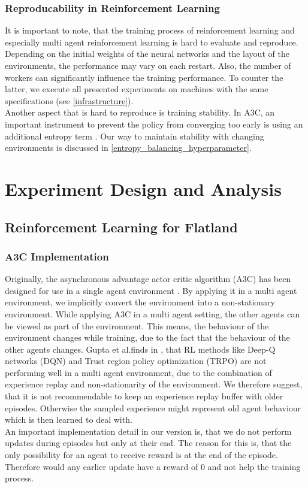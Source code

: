 \subsection*{Reproducability in Reinforcement Learning}\label{reproducability}
It is important to note, that the training process of reinforcement learning and especially multi agent reinforcement learning is hard to evaluate and reproduce. Depending on the initial weights of the neural networks and the layout of the environments, the performance may vary on each restart. Also, the number of workers can 
significantly influence the training performance. To counter the latter, we execute all presented experiments on machines with the same specifications (see \autoref{infrastructure}).\\
Another aspect that is hard to reproduce is training stability. In A3C, an important instrument to prevent the policy from converging too early is using an additional entropy term \cite{a3c}. Our way to maintain stability with changing environments is discussed in \autoref{entropy_balancing_hyperparameter}.
\chapter{Experiment Design and Analysis}\label{chap.experiment}
\section{Reinforcement Learning for Flatland}
\subsection*{A3C Implementation}\label{a3c_implementation}
Originally, the asynchronous advantage actor critic algorithm (A3C) has been designed for use in a single agent environment \cite{a3c}.
By applying it in a multi agent environment, we implicitly convert the environment into a non-stationary environment.
While applying A3C in a multi agent setting, the other agents can be viewed as part of the environment. This means, the behaviour of the environment changes while training, due to the fact that the behaviour of the other agents changes.
Gupta et al.finds in \cite{multiagent_comp_a3c_dqn_etc}, that RL methods like Deep-Q networks (DQN) and Trust region policy optimization (TRPO) are not performing well in a multi agent environment, due to the combination of experience replay and non-stationarity of the environment. We therefore suggest, that it is not recommendable to keep an experience replay buffer with older episodes. Otherwise the sampled experience might represent old agent behaviour which is then learned to deal with.\\
An important implementation detail in our version is, that we do not perform updates during episodes but only at their end. The reason for this is, that the only possibility for an agent to receive reward is at the end of the episode. Therefore would any earlier update have a reward of 0 and not help the training process.

